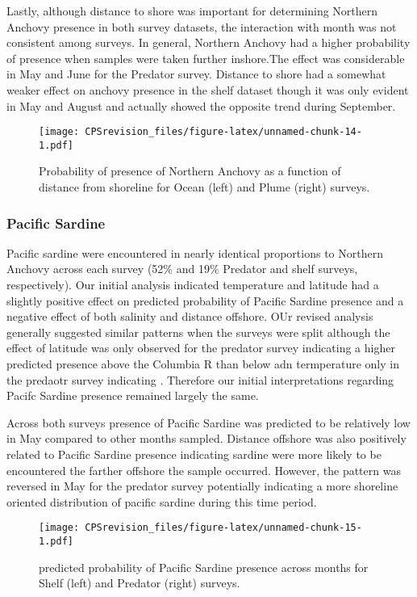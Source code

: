\documentclass[
]{article}
\begin{document}
Lastly, although distance to shore was important for determining
Northern Anchovy presence in both survey datasets, the interaction with
month was not consistent among surveys. In general, Northern Anchovy had
a higher probability of presence when samples were taken further
inshore.The effect was considerable in May and June for the Predator
survey. Distance to shore had a somewhat weaker effect on anchovy
presence in the shelf dataset though it was only evident in May and
August and actually showed the opposite trend during September.

\begin{figure}
\centering
\texttt{[image: CPSrevision\_files/figure-latex/unnamed-chunk-14-1.pdf]}
\caption{Probability of presence of Northern Anchovy as a function of
distance from shoreline for Ocean (left) and Plume (right) surveys.}
\end{figure}

\hypertarget{pacific-sardine-1}{%
\subsubsection{Pacific Sardine}\label{pacific-sardine-1}}

Pacific sardine were encountered in nearly identical proportions to
Northern Anchovy across each survey (52\% and 19\% Predator and shelf
surveys, respectively). Our initial analysis indicated temperature and
latitude had a slightly positive effect on predicted probability of
Pacific Sardine presence and a negative effect of both salinity and
distance offshore. OUr revised analysis generally suggested similar
patterns when the surveys were split although the effect of latitude was
only observed for the predator survey indicating a higher predicted
presence above the Columbia R than below adn termperature only in the
predaotr survey indicating . Therefore our initial interpretations
regarding Pacifc Sardine presence remained largely the same.

Across both surveys presence of Pacific Sardine was predicted to be
relatively low in May compared to other months sampled. Distance
offshore was also positively related to Pacific Sardine presence
indicating sardine were more likely to be encountered the farther
offshore the sample occurred. However, the pattern was reversed in May
for the predator survey potentially indicating a more shoreline oriented
distribution of pacific sardine during this time period.

\begin{figure}
\centering
\texttt{[image: CPSrevision\_files/figure-latex/unnamed-chunk-15-1.pdf]}
\caption{predicted probability of Pacific Sardine presence across months
for Shelf (left) and Predator (right) surveys.}
\end{figure}
\end{document}
